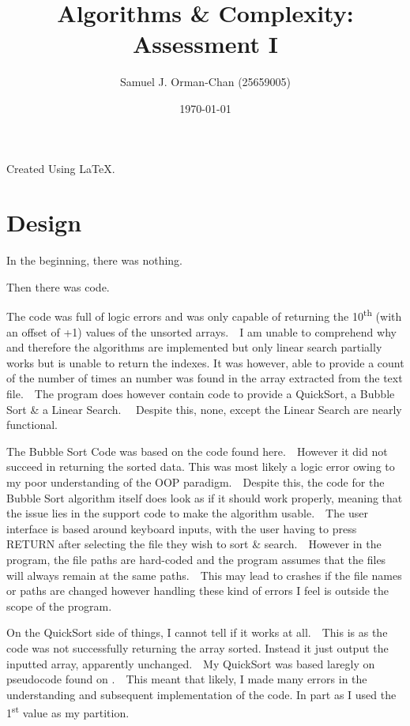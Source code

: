 \documentclass[11pt]{article} %
\title{Algorithms \& Complexity: Assessment I}
\author{Samuel J. Orman-Chan (25659005)}
\date{\today} %
\begin{document}
\maketitle
\tableofcontents
\vfill
\begin{center}Created Using \LaTeX.\end{center}
\newpage
\section{Design}
In the beginning, there was nothing.~~\par 
Then there was code.~~\par 
The code was full of logic errors and was only capable of returning the 10\textsuperscript{th} (with an offset of +1) values of the unsorted arrays.~~I am unable to comprehend why and therefore the algorithms are implemented but only linear search partially works but is unable to return the indexes. It was however, able to provide a count of the number of times an number was found in the array extracted from the text file.~~The program does however contain code to provide a QuickSort, a Bubble Sort \& a Linear Search.~~ Despite this, none, except the Linear Search are nearly functional.\par
The Bubble Sort Code was based on the code found here\autocite[1]{unknown_bubble_2014}.~~However it did not succeed in returning the sorted data. This was most likely a logic error owing to my poor understanding of the OOP paradigm.~~Despite this, the code for the Bubble Sort algorithm itself does look as if it should work properly, meaning that the issue lies in the support code to make the algorithm usable.~~The user interface is based around keyboard inputs, with the user having to press RETURN after selecting the file they wish to sort \& search.~~However in the program, the file paths are hard-coded and the program assumes that the files will always remain at the same paths.~~This may lead to crashes if the file names or paths are changed however handling these kind of errors I feel is outside the scope of the program. \par
On the QuickSort side of things, I cannot tell if it works at all.~~This is as the code was not successfully returning the array sorted. Instead it just output the inputted array, apparently unchanged.~~My QuickSort was based laregly on pseudocode found on \autocite[1]{noauthor_quicksort_2022}.~~This meant that likely, I made many errors in the understanding and subsequent implementation of the code. In part as I used the 1\textsuperscript{st} value as my partition.\par
\end{document}
